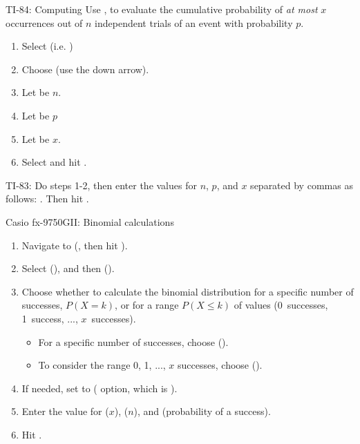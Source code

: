 \begin{onebox}{ TI-84: Computing  }
\label{binomialcumulative}
Use  ,  to evaluate the cumulative probability of \emph{at most} $x$ occurrences out of $n$ independent trials of an event with probability $p$. 
\begin{enumerate}
\setlength{\itemsep}{0mm}
\item Select   (i.e. )
\item Choose  (use the down arrow).
\item Let  be $n$.
\item Let  be $p$
\item Let  be $x$.
\item Select  and hit .\vspace{-1.5mm}
\end{enumerate}
TI-83: Do steps 1-2, then enter the values for $n$, $p$, and $x$ separated by commas as follows: . Then hit .\end{onebox}


\begin{onebox}{ Casio fx-9750GII: Binomial calculations}
\begin{enumerate}
\setlength{\itemsep}{0mm}
\item Navigate to  (, then hit ).
\item Select  (), and then  ().
\item Choose whether to calculate the binomial distribution for a specific number of successes, $P(X = k)$, or for a range $P(X \leq k)$ of values (0~successes, 1~success, ..., $x$~successes).\vspace{-1.5mm}
  \begin{itemize}
  \setlength{\itemsep}{0mm}
  \item For a specific number of successes, choose  (). %
  \item To consider the range 0, 1, ..., $x$ successes, choose (). %
  \end{itemize}
\item If needed, set  to  ( option, which is ).
\item Enter the value for  ($x$),  ($n$), and  (probability of a success).
\item Hit .
\end{enumerate}
\end{onebox}

